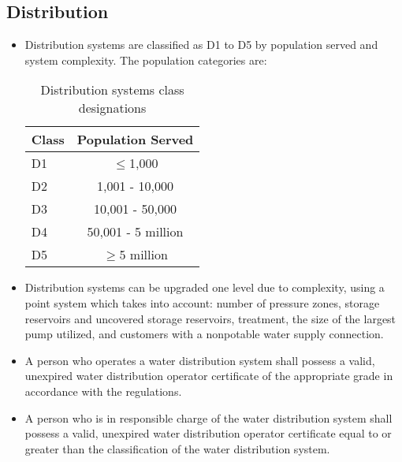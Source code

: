 \subsection{Distribution}
\begin{itemize}
\item Distribution systems are classified as D1 to D5 by population served and system complexity. The population categories are:\\
\begin{table}[H]
\begin{center}
\captionsetup{justification=centering}
\begin{tabular}{|l|c|}
\hline
\textbf{Class} & \textbf{Population Served} \\
\hline
D1 & $\leq$1,000\\
\hline
D2 & 1,001 - 10,000\\
\hline
D3 &  10,001 - 50,000\\
\hline
D4 & 50,001 - 5 million\\
\hline
D5 & $\geq$5 million\\
\hline
\end{tabular}
\caption{Distribution systems class designations}
\end{center}
\end{table} 
\item Distribution systems can be upgraded one level due to complexity, using a point system which takes into account: number of pressure zones, storage reservoirs and uncovered storage reservoirs, treatment, the size of the largest pump utilized, and customers with a nonpotable water supply connection. 
\item A person who operates a water distribution system shall possess a valid, unexpired water distribution operator certificate of the appropriate grade in accordance with the regulations.
\item  A person who is in responsible charge of the water distribution system shall possess a valid, unexpired water distribution operator certificate equal to or greater than the classification of the water distribution system.
\end{itemize}

